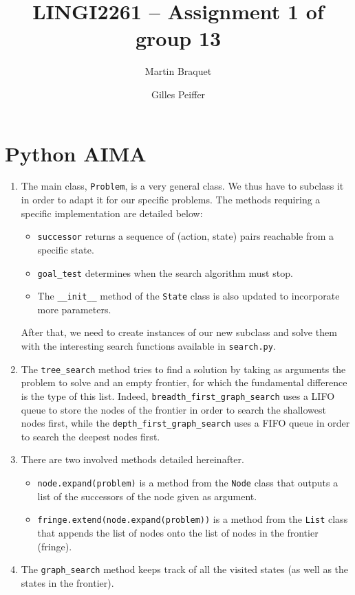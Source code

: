 \documentclass[a4paper,10pt]{article}
\title{LINGI2261 -- Assignment 1 of group 13}
\author{Martin Braquet \and Gilles Peiffer}
\newcommand{\py}[1]{\texttt{#1}}
\begin{document}
\maketitle

\section{Python AIMA}

\begin{enumerate}
 \item The main class, \py{Problem}, is a very general class. We thus have to subclass it in order to adapt it for our specific problems. The methods requiring a specific implementation are detailed below:
 
 \begin{itemize}
  \item \py{successor} returns a sequence of (action, state) pairs reachable from a specific state.
  \item \py{goal_test} determines when the search algorithm must stop.
  \item The \py{__init__} method of the \py{State} class is also updated to incorporate more parameters.
 \end{itemize}
 After that, we need to create instances of our new subclass and solve them with the interesting search functions available in \texttt{search.py}.
 \item The \py{tree_search} method tries to find a solution by taking as arguments the problem to solve and an empty frontier, for which the fundamental difference is the type of this list.
 Indeed, \py{breadth_first_graph_search} uses a LIFO queue to store the nodes of the frontier in order to search the shallowest nodes first, while the \py{depth_first_graph_search} uses a FIFO queue in order to search the deepest nodes first.
 \item There are two involved methods detailed hereinafter.
 \begin{itemize}
 	\item \py{node.expand(problem)} is a method from the \py{Node} class that outputs a list of the successors of the node given as argument.
 	\item \py{fringe.extend(node.expand(problem))} is a method from the \py{List} class that appends the list of nodes onto the list of nodes in the frontier (fringe).
 \end{itemize}
 \item The \py{graph_search} method keeps track of all the visited states (as well as the states in the frontier).

\end{enumerate}
\end{document}
